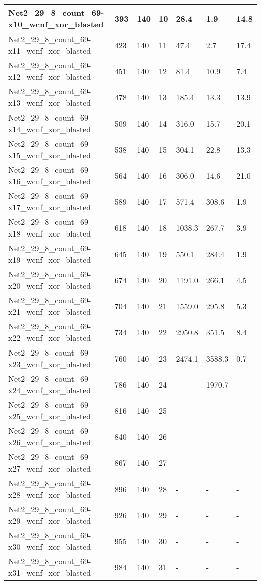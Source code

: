 \begin{scriptsize}
\begin{longtable}{|p{5cm}|l|l|l|l|l|l|}
Net2\_29\_8\_count\_69-x10\_wcnf\_xor\_blasted&393&140&10&28.4&1.9&14.8 \\ \hline 
Net2\_29\_8\_count\_69-x11\_wcnf\_xor\_blasted&423&140&11&47.4&2.7&17.4 \\ \hline 
Net2\_29\_8\_count\_69-x12\_wcnf\_xor\_blasted&451&140&12&81.4&10.9&7.4 \\ \hline 
Net2\_29\_8\_count\_69-x13\_wcnf\_xor\_blasted&478&140&13&185.4&13.3&13.9 \\ \hline 
Net2\_29\_8\_count\_69-x14\_wcnf\_xor\_blasted&509&140&14&316.0&15.7&20.1 \\ \hline 
Net2\_29\_8\_count\_69-x15\_wcnf\_xor\_blasted&538&140&15&304.1&22.8&13.3 \\ \hline 
Net2\_29\_8\_count\_69-x16\_wcnf\_xor\_blasted&564&140&16&306.0&14.6&21.0 \\ \hline 
Net2\_29\_8\_count\_69-x17\_wcnf\_xor\_blasted&589&140&17&571.4&308.6&1.9 \\ \hline 
Net2\_29\_8\_count\_69-x18\_wcnf\_xor\_blasted&618&140&18&1038.3&267.7&3.9 \\ \hline 
Net2\_29\_8\_count\_69-x19\_wcnf\_xor\_blasted&645&140&19&550.1&284.4&1.9 \\ \hline 
Net2\_29\_8\_count\_69-x20\_wcnf\_xor\_blasted&674&140&20&1191.0&266.1&4.5 \\ \hline 
Net2\_29\_8\_count\_69-x21\_wcnf\_xor\_blasted&704&140&21&1559.0&295.8&5.3 \\ \hline 
Net2\_29\_8\_count\_69-x22\_wcnf\_xor\_blasted&734&140&22&2950.8&351.5&8.4 \\ \hline 
Net2\_29\_8\_count\_69-x23\_wcnf\_xor\_blasted&760&140&23&2474.1&3588.3&0.7 \\ \hline 
Net2\_29\_8\_count\_69-x24\_wcnf\_xor\_blasted&786&140&24&-&1970.7&- \\ \hline 
Net2\_29\_8\_count\_69-x25\_wcnf\_xor\_blasted&816&140&25&-&-&- \\ \hline 
Net2\_29\_8\_count\_69-x26\_wcnf\_xor\_blasted&840&140&26&-&-&- \\ \hline 
Net2\_29\_8\_count\_69-x27\_wcnf\_xor\_blasted&867&140&27&-&-&- \\ \hline 
Net2\_29\_8\_count\_69-x28\_wcnf\_xor\_blasted&896&140&28&-&-&- \\ \hline 
Net2\_29\_8\_count\_69-x29\_wcnf\_xor\_blasted&926&140&29&-&-&- \\ \hline 
Net2\_29\_8\_count\_69-x30\_wcnf\_xor\_blasted&955&140&30&-&-&- \\ \hline 
Net2\_29\_8\_count\_69-x31\_wcnf\_xor\_blasted&984&140&31&-&-&- \\ \hline 

\end{longtable}
\end{scriptsize}
